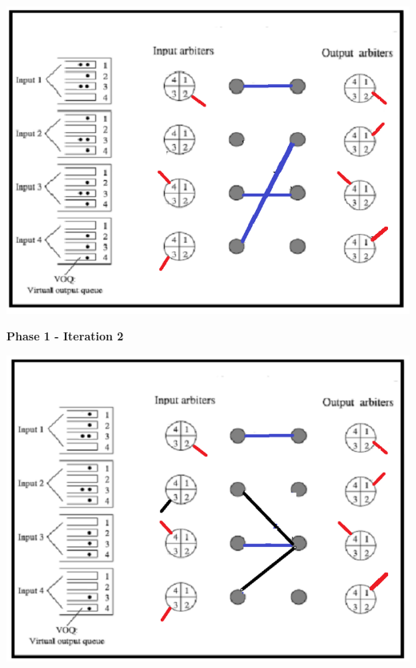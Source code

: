 \begin{qsolve}
	\begin{latin}
		
		\begin{center}
			\includegraphics*[width=0.7\linewidth]{pics/img15.png}
		\end{center}
		
		
		\textbf{Phase 1 - Iteration 2}\\
		\begin{center}
			\includegraphics*[width=0.7\linewidth]{pics/img16.png}
		\end{center}
		
	\end{latin}
\end{qsolve}
\newpage



